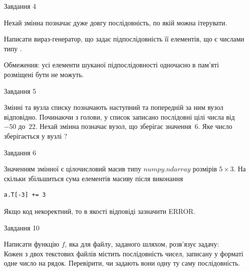 \documentclass[12pt, ukrainian]{article}
\begin{document}
{\begin{minipage}[t]{8.0cm}
\begin{verbatim}
\end{verbatim}            

\end{minipage}


               
{\begin{center}Завдання {4}\end{center}}
\vspace{-4mm}
Нехай змінна  позначає дуже довгу послідовність, по якій можна ітерувати.

Написати вираз-генератор, що задає підпослідовність її елементів, що є числами типу .

Обмеження: усі елементи шуканої підпослідовності одночасно в пам'яті розміщені бути не можуть.\par

\vspace{10mm}
               
{\begin{center}Завдання {5}\end{center}}
\vspace{-4mm}
Змінні  та  вузла списку позначають наступний та попередній за ним вузол відповідно. Починаючи з голови, у список записано послідовні цілі числа від~$-50$ до~$22$. Нехай змінна  позначає вузол, що зберігає значення~$6$.
Яке число зберігається у вузлі  ?\par

               
{\begin{center}Завдання {6}\end{center}}
\vspace{-4mm}
Значенням змінної  є цілочисловий масив типу $numpy.ndarray$ розмірів $5{\times}3$. На скільки збільшиться сума елементів масиву  після виконання
\begin{verbatim}
a.T[-3] += 3
\end{verbatim}


Якщо код некоректний, то в якості відповіді зазначити ERROR.\par

               
{\begin{center}Завдання {10}\end{center}}
\vspace{-4mm}

Написати функцію $f$, яка для файлу, заданого шляхом, розв’язує задачу:\\ Кожен з двох текстових файлів містить послідовність чисел, записану у форматі одне число на рядок.  Перевірити, чи задають вони одну ту саму послідовність.

}
\end{document}
